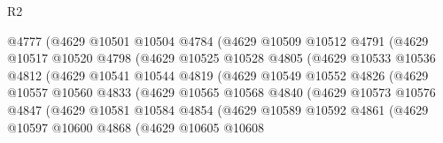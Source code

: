 \begin{lexlean}{R2}
\begin{coremodule}
                          @4777
                          (@4629
                            @10501
                            @10504
                            @4784
                            (@4629
                              @10509
                              @10512
                              @4791
                              (@4629
                                @10517
                                @10520
                                @4798
                                (@4629
                                  @10525
                                  @10528
                                  @4805
                                  (@4629
                                    @10533
                                    @10536
                                    @4812
                                    (@4629
                                      @10541
                                      @10544
                                      @4819
                                      (@4629
                                        @10549
                                        @10552
                                        @4826
                                        (@4629
                                          @10557
                                          @10560
                                          @4833
                                          (@4629
                                            @10565
                                            @10568
                                            @4840
                                            (@4629
                                              @10573
                                              @10576
                                              @4847
                                              (@4629
                                                @10581
                                                @10584
                                                @4854
                                                (@4629
                                                  @10589
                                                  @10592
                                                  @4861
                                                  (@4629
                                                    @10597
                                                    @10600
                                                    @4868
                                                    (@4629
                                                      @10605
                                                      @10608

\end{coremodule}
\end{lexlean}

